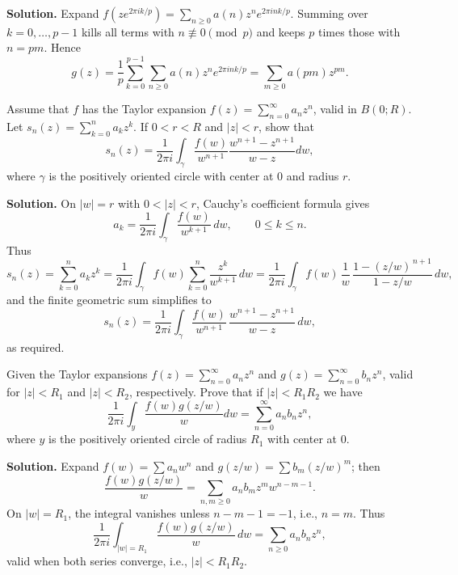 \noindent\textbf{Solution.}
Expand $f(ze^{2\pi ik/p})=\sum_{n\ge0} a(n) z^n e^{2\pi i n k/p}$. Summing over $k=0,\dots,p-1$ kills all terms with $n\not\equiv0\pmod p$ and keeps $p$ times those with $n=pm$. Hence
\[g(z)=\frac1p\sum_{k=0}^{p-1}\sum_{n\ge0} a(n)z^n e^{2\pi i nk/p}=\sum_{m\ge0}a(pm) z^{pm}.\]

\begin{problembox}
Assume that \( f \) has the Taylor expansion \( f(z) = \sum_{n=0}^{\infty} a_n z^n \), valid in \( B(0; R) \). Let \( s_n(z) = \sum_{k=0}^{n} a_k z^k \). If \( 0 < r < R \) and \( |z| < r \), show that
\[ s_n(z) = \frac{1}{2\pi i} \int_\gamma \frac{f(w)}{w^{n+1}} \frac{w^{n+1} -z^{n+1}}{w - z} dw, \]
where \( \gamma \) is the positively oriented circle with center at 0 and radius \( r \).
\end{problembox}

\noindent\textbf{Solution.}
On $|w|=r$ with $0<|z|<r$, Cauchy's coefficient formula gives
\[a_k=\frac{1}{2\pi i}\int_\gamma \frac{f(w)}{w^{k+1}}\,dw,\qquad 0\le k\le n.\]
Thus
\[ s_n(z)=\sum_{k=0}^n a_k z^k=\frac{1}{2\pi i}\int_\gamma f(w)\sum_{k=0}^n \frac{z^k}{w^{k+1}}\,dw
=\frac{1}{2\pi i}\int_\gamma f(w)\,\frac{1}{w}\,\frac{1-(z/w)^{\,n+1}}{1-z/w}\,dw,\]
and the finite geometric sum simplifies to
\[ s_n(z)=\frac{1}{2\pi i}\int_\gamma \frac{f(w)}{w^{n+1}}\,\frac{w^{n+1}-z^{n+1}}{w-z}\,dw, \]
as required.



\begin{problembox}
Given the Taylor expansions \( f(z) = \sum_{n=0}^{\infty} a_n z^n \) and \( g(z) = \sum_{n=0}^{\infty} b_n z^n \), valid for \( |z| < R_1 \) and \( |z| < R_2 \), respectively. Prove that if \( |z| < R_1 R_2 \) we have
\[ \frac{1}{2\pi i} \int_y \frac{f(w) g(z/w)}{w} dw = \sum_{n=0}^{\infty} a_n b_n z^n, \]
where \( y \) is the positively oriented circle of radius \( R_1 \) with center at 0.
\end{problembox}

\noindent\textbf{Solution.}
Expand $f(w)=\sum a_n w^n$ and $g(z/w)=\sum b_m (z/w)^m$; then
\[\frac{f(w)g(z/w)}{w}=\sum_{n,m\ge0} a_n b_m z^m w^{n-m-1}.\]
On $|w|=R_1$, the integral vanishes unless $n-m-1=-1$, i.e., $n=m$. Thus
\[\frac{1}{2\pi i}\int_{|w|=R_1}\frac{f(w)g(z/w)}{w}\,dw=\sum_{n\ge0} a_n b_n z^n,\]
valid when both series converge, i.e., $|z|<R_1R_2$.

